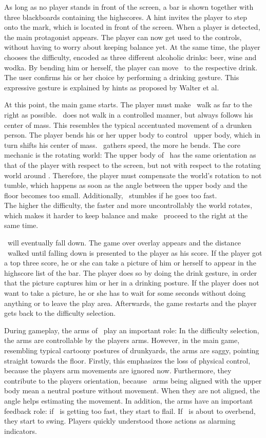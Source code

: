 As long as no player stands in front of the screen, a bar is shown together with three blackboards containing the highscores. A hint invites the player to step onto the mark, which is located in front of the screen. When a player is detected, the main protagonist \ed appears. The player can now get used to the controls, without having to worry about keeping balance yet. At the same time, the player chooses the difficulty, encoded as three different alcoholic drinks: beer, wine and wodka. By bending him or herself, the player can move \ed\ to the respective drink. The user confirms his or her choice by performing a drinking gesture. This expressive gesture is explained by hints as proposed by Walter et al. \cite{walter2013strikeapose}\lbreak

At this point, the main game starts. The player must make \ed\ walk as far to the right as possible. \ed\ does not walk in a controlled manner, but always follows his center of mass. This resembles the typical accentuated movement of a drunken person. The player bends his or her upper body to control \eds\ upper body, which in turn shifts his center of mass. \ed\ gathers speed, the more he bends. The core mechanic is the rotating world: The upper body of \ed\ has the same orientation as that of the player with respect to the screen, but not with respect to the rotating world around \ed. Therefore, the player must compensate the world's rotation to not tumble, which happens as soon as the angle between the upper body and the floor becomes too small. Additionally, \ed\ stumbles if he goes too fast.\\
The higher the difficulty, the faster and more uncontrollably the world rotates, which makes it harder to keep balance and make \ed\ proceed to the right at the same time.\lbreak

\ed\ will eventually fall down. The game over overlay appears and the distance \ed\ walked until falling down is presented to the player as his score. If the player got a top three score, he or she can take a picture of him or herself to appear in the highscore list of the bar. The player does so by doing the drink gesture, in order that the picture captures him or her in a drinking posture. If the player does not want to take a picture, he or she has to wait for some seconds without doing anything or to leave the play area. Afterwards, the game restarts and the player gets back to the difficulty selection.\lbreak

During gameplay, the arms of \ed\ play an important role: In the difficulty selection, the arms are controllable by the players arms. However, in the main game, resembling typical cartoony postures of drunkyards, the arms are saggy, pointing straight towards the floor. Firstly, this emphasizes the loss of physical control, because the players arm movements are ignored now. Furthermore, they contribute to the players orientation, because \eds\ arms being aligned with the upper body mean a neutral posture without movement. When they are not aligned, the angle helps estimating the movement. In addition, the arms have an important feedback role: if \ed\ is getting too fast, they start to flail. If \ed\ is about to overbend, they start to swing. Players quickly understood those actions as alarming indicators.
